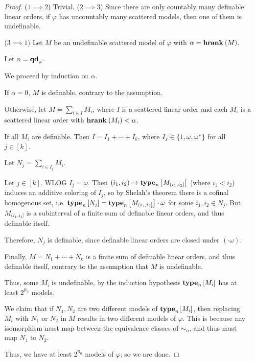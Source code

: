 \begin{proof}
    ($1 \implies 2$) Trivial.
    ($2 \implies 3$) Since there are only countably many
    definable linear orders,
    if $\varphi$ has uncountably many scattered models,
    then one of them is undefinable.

    ($3 \implies 1$)
    Let $M$ be an undefinable scattered model of $\varphi$
    with $\alpha = \mathbf{hrank}_{} \left( {M} \right)$.

    Let $n = \mathbf{qd}_{\varphi}$.

    We proceed by induction on $\alpha$.

    If $\alpha = 0$, $M$ is definable, contrary to the assumption.

    Otherwise, let $M = \sum_{i \in I} M_i$,
    where $I$ is a scattered linear order
    and each $M_i$ is a scattered linear order with $\mathbf{hrank}_{} \left( {M_i} \right) < \alpha$.

    If all $M_i$ are definable. Then $I = I_1 + \cdots + I_k$,
    where $I_j \in \left\{ {1, \omega, \omega^\ast} \right\}$ for all $j \in [k]$.

    Let $N_j = \sum_{i \in I_j} M_i$.

    Let $j \in [k]$. WLOG $I_j = \omega$.
    Then $(i_1, i_2) \mapsto \mathbf{type}_{n} \left[ {M_{(i_1, i_2]}} \right]$ (where $i_1 < i_2$)
    induces an additive coloring of $I_j$, so by Shelah's theorem
    there is a cofinal homogenous set,
    i.e. $\mathbf{type}_{n} \left[ {N_j} \right] = \mathbf{type}_{n} \left[ {M_{(i_1, i_2]}} \right] \cdot \omega$ for some
    $i_1, i_2 \in N_j$. But $M_{(i_1, i_2]}$ is a subinterval
    of a finite sum of definable linear orders,
    and thus definable itself.

    Therefore, $N_j$ is definable, since
    definable linear orders are closed under $(\cdot \omega)$.

    Finally, $M = N_1 + \cdots + N_k$ is a finite sum of definable linear orders,
    and thus definable itself, contrary to the assumption that $M$ is undefinable.

    Thus, some $M_i$ is undefinable, by the induction
    hypothesis $\mathbf{type}_{n} \left[ {M_i} \right]$ has at least
    $2^{\aleph_0}$ models.

    We claim that if $N_1, N_2$ are two different models of $\mathbf{type}_{n} \left[ {M_i} \right]$,
    then replacing $M_i$ with $N_1$ or $N_2$ in $M$
    results in two different models of $\varphi$.
    This is because any isomorphism must map
    between the equivalence classes of $\sim_{\alpha}$,
    and thus must map $N_1$ to $N_2$.

    Thus, we have at least $2^{\aleph_0}$ models of $\varphi$,
    so we are done.
\end{proof}

